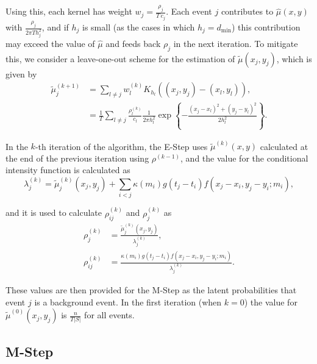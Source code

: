 Using this, each kernel has weight $w_{j} = \frac{\rho_{j}}{T\,c_{j}}$. Each event $j$ contributes to $\hat{\mu}(x,y)$ with $\frac{\rho_{j}}{2\pi Th_{j}^{2}}$, and if $h_{j}$ is small (as the cases in which $h_{j} = d_{\text{min}}$) this contribution may exceed the value of $\hat{\mu}$ and feeds back $\rho_{j}$ in the next iteration. To mitigate this, we consider a leave-one-out scheme for the estimation of $\tilde{\mu}(x_{j},y_{j})$, which is given by
\begin{equation}
  \label{eq-tilde-mu}
  \begin{split}
    \tilde\mu_{j}^{(k + 1)} &= \sum_{l \neq j}w_l^{(k)}K_{h_{l}}\left((x_{j}, y_{j}) - (x_{l}, y_{l})\right), \\
                            &= \frac{1}{T}\sum_{l \neq j}\frac{\rho_{l}^{(k)}}{c_{l}}\frac{1}{2\pi h_{l}^{2}}\exp\left\{-\frac{(x_{j} - x_{l})^{2} + (y_{j} - y_{l})^{2}}{2h_{l}^{2}}\right\}.
    \end{split}
\end{equation}

In the $k$-th iteration of the algorithm, the E-Step uses $\tilde{\mu}^{(k)}(x,y)$ calculated at the end of the previous iteration using $\rho^{(k - 1)}$, and the value for the conditional intensity function is calculated as
\begin{equation*}
    \lambda_{j}^{(k)} = \tilde{\mu}_{j}^{(k)}(x_{j},y_{j}) + \sum_{i<j}\kappa(m_{i})g(t_{j} - t_{i})f(x_{j} - x_{i}, y_{j} - y_{i}; m_{i}),
\end{equation*}

\noindent and it is used to calculate $\rho_{ij}^{(k)}$ and $\rho_{j}^{(k)}$ as
\begin{equation*}
  \begin{split}
    \rho_{j}^{(k)} &= \frac{\tilde{\mu}_{j}^{(k)}(x_{j}, y_{j})}{\lambda_{j}^{(k)}}, \\
    \rho_{ij}^{(k)} &= \frac{\kappa(m_{i})g(t_{j} - t_{i})f(x_{j} - x_{i}, y_{j} - y_{i}; m_{i})}{\lambda_{j}^{(k)}}.
    \end{split}
\end{equation*}

These values are then provided for the M-Step as the latent probabilities that event $j$ is a background event. In the first iteration (when $k = 0$) the value for $\tilde{\mu}^{(0)}(x_{j},y_{j})$ is $\frac{n}{T|S|}$ for all events.

\subsection{M-Step}
\label{subsec-m-step}

